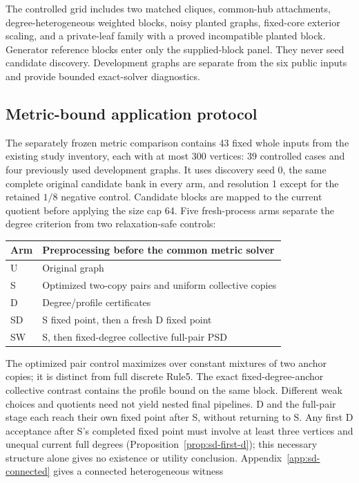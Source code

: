 \documentclass[sigconf,anonymous,review]{acmart}
\newcommand{\1}{\mathbf{1}}
\begin{document}
The controlled grid includes two matched cliques, common-hub attachments,
degree-heterogeneous weighted blocks, noisy planted graphs, fixed-core exterior
scaling, and a private-leaf family with a proved incompatible planted block.
Generator reference blocks enter only the supplied-block panel. They never
seed candidate discovery. Development graphs are separate from the six public
inputs and provide bounded exact-solver diagnostics.

\subsection{Metric-bound application protocol}\label{sec:metric-protocol}
The separately frozen metric comparison contains 43 fixed whole inputs from
the existing study inventory, each with at most 300 vertices:
39 controlled cases and four previously used development graphs. It uses
discovery seed 0, the same complete original candidate bank in every arm,
and resolution 1 except for the retained $1/8$ negative control. Candidate
blocks are mapped to the current quotient before applying the size cap 64.
Five fresh-process arms separate the degree criterion from two
relaxation-safe controls:
\begin{center}
\small
\begin{tabular}{ll}\toprule
Arm & Preprocessing before the common metric solver\\\midrule
U & Original graph\\
S & Optimized two-copy pairs and uniform collective copies\\
D & Degree/profile certificates\\
SD & S fixed point, then a fresh D fixed point\\
SW & S, then fixed-degree collective full-pair PSD\\\bottomrule
\end{tabular}
\end{center}
The optimized pair control maximizes over constant mixtures of two anchor
copies; it is distinct from full discrete Rule5. The exact fixed-degree-anchor
collective contrast
contains the profile bound on the same block. Different weak choices and
quotients need not yield nested final pipelines. D and the full-pair stage
each reach their own fixed point after S, without returning to S.
Any first D acceptance after S's completed fixed point must involve at least
three vertices and unequal current full degrees
(Proposition~\ref{prop:sd-first-d}); this necessary structure alone
gives no existence or utility conclusion. Appendix~\ref{app:sd-connected} gives a connected heterogeneous witness
\end{document}
